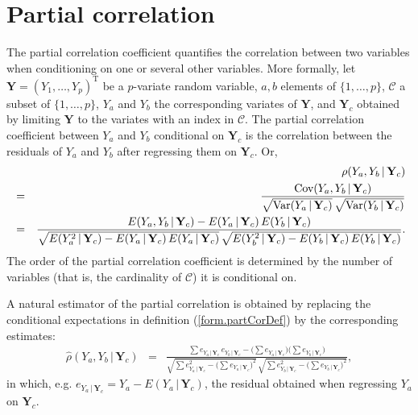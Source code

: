 \documentclass[a4paper]{article}
\theoremstyle{myexamplestyle}
\begin{document}
\section{Partial correlation}
\noindent
The partial correlation coefficient quantifies the correlation between two variables when conditioning on one or several other variables. 
More formally, let $\mathbf{Y} = (Y_1, \ldots, Y_p)^{\mathrm{T}}$ be a $p$-variate random variable, 
$a, b$ elements of $\{1, \ldots, p\}$, $\mathcal{C}$ a subset of $\{1, \ldots, p\}$,
$Y_a$ and $Y_b$ the corresponding variates of $\mathbf{Y}$, and $\mathbf{Y}_c$ obtained by limiting $\mathbf{Y}$ to the variates with an index in $\mathcal{C}$.
The partial correlation coefficient between $Y_a$ and $Y_b$ conditional on $\mathbf{Y}_{c}$ is the correlation between the residuals of $Y_a$ and $Y_b$ after regressing them on $\mathbf{Y}_c$. 
Or, 
\begin{eqnarray}  \nonumber
& & \hspace{-1.5cm}
\rho (Y_a, Y_b \, | \, \mathbf{Y}_c ) 
\\
\nonumber
& = & \frac{\mbox{Cov}(Y_a, Y_b \, | \, \mathbf{Y}_c)}
{\sqrt{\mbox{Var}(Y_a \, | \, \mathbf{Y}_c)} \, \sqrt{\mbox{Var}(Y_b \, | \, \mathbf{Y}_c) }}
\\
\label{form.partCorDef}
& = & \frac{E(Y_a, Y_b \, | \, \mathbf{Y}_c) - E(Y_a \, | \, \mathbf{Y}_c) \, E(Y_b \, | \, \mathbf{Y}_c)}
{\sqrt{E(Y_a^2 \, | \, \mathbf{Y}_c) - E(Y_a \, | \, \mathbf{Y}_c) \, E(Y_a \, | \, \mathbf{Y}_c)} \,
 \sqrt{E(Y_b^2 \, | \, \mathbf{Y}_c) - E(Y_b \, | \, \mathbf{Y}_c) \, E(Y_b \, | \, \mathbf{Y}_c)}}.
\end{eqnarray}
The order of the partial correlation coefficient is determined by the number of variables (that is, the cardinality of $\mathcal{C}$) it is conditional on.

A natural estimator of the partial correlation is obtained by replacing the conditional expectations in definition (\ref{form.partCorDef}) by the corresponding estimates:
\begin{eqnarray*}
\hat{\rho} (Y_a, Y_b \, | \, \mathbf{Y}_c ) & = & \frac{\sum e_{Y_a \, | \, \mathbf{Y}_c} \, e_{Y_b \, | \, \mathbf{Y}_c} - \big( \sum e_{Y_a \, | \, \mathbf{Y}_c} \big)
\big( \sum e_{Y_b \, | \, \mathbf{Y}_c} \big)}{
\sqrt{ \sum e_{Y_a \, | \, \mathbf{Y}_c}^2 - \big( \sum e_{Y_a \, | \, \mathbf{Y}_c} \big)^2} \,
\sqrt{ \sum e_{Y_b \, | \, \mathbf{Y}_c}^2 - \big( \sum e_{Y_b \, | \, \mathbf{Y}_c} \big)^2}
},
\end{eqnarray*}
in which, e.g. $e_{Y_a \, | \, \mathbf{Y}_c} = Y_a - E(Y_a \, | \, \mathbf{Y}_c)$, the residual obtained when regressing $Y_a$ on $\mathbf{Y}_c$.
\end{document}
